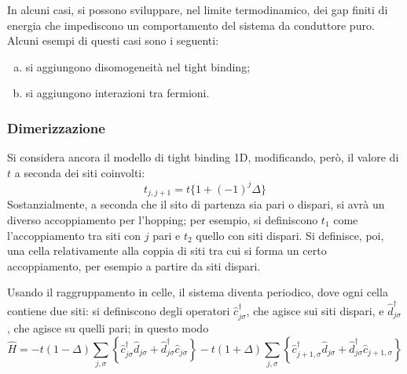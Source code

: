 \documentclass[11pt, a4paper]{scrartcl}
\theoremstyle{style}
\theoremstyle{style1}
\numberwithin{equation}{subsection}
\begin{document}
In alcuni casi, si possono sviluppare, nel limite termodinamico, dei gap finiti di energia che impediscono un comportamento del sistema da conduttore puro.
Alcuni esempi di questi casi sono i seguenti:
\begin{enumerate}[(a).]
	\item si aggiungono disomogeneit\`a nel tight binding;
	\item si aggiungono interazioni tra fermioni.
\end{enumerate}
\subsubsection{Dimerizzazione}

Si considera ancora il modello di tight binding 1D, modificando, per\`o, il valore di $t$ a seconda dei siti coinvolti:
\[
t_{j,j+1} = t \Big\{ 1+ (-1)^j\Delta \Big\} 
\] 
Sostanzialmente, a seconda che il sito di partenza sia pari o dispari, si avr\`a un diverso accoppiamento per l'hopping; per esempio, si definiscono $t_1$ come l'accoppiamento tra siti con $j$ pari e $t_2$ quello con siti dispari.
Si definisce, poi, una cella relativamente alla coppia di siti tra cui si forma un certo accoppiamento, per esempio a partire da siti dispari.
\begin{center}
\end{center}
Usando il raggruppamento in celle, il sistema diventa periodico, dove ogni cella contiene due siti: si definiscono degli operatori $\hat{c}_{j\sigma } ^\dagger $, che agisce sui siti dispari, e $\hat{d}^\dagger _{j\sigma } $, che agisce su quelli pari; in questo modo
\[
\hat{H} = - t (1-\Delta ) \sum_{j,\sigma }^{} \left\{ \hat{c}^\dagger _{j\sigma } \hat{d}_{j\sigma } + \hat{d}^\dagger _{j\sigma } \hat{c}_{j\sigma }  \right\} - t (1+\Delta ) \sum_{j,\sigma }^{} \left\{ \hat{c}^\dagger _{j+1,\sigma } \hat{d}_{j\sigma } + \hat{d}^\dagger _{j\sigma } \hat{c}_{j+1,\sigma }  \right\}
\] 
\end{document}
